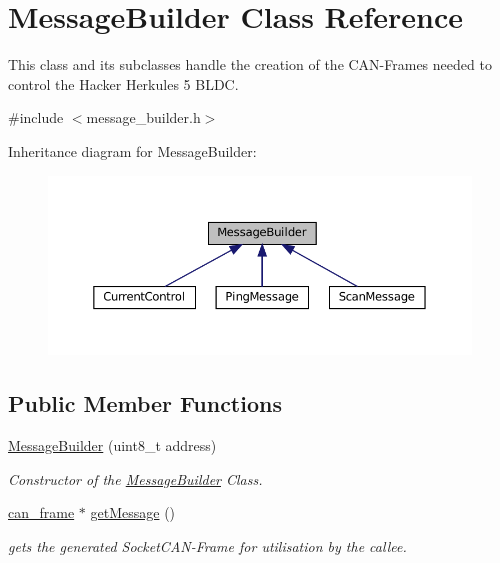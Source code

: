 \hypertarget{classMessageBuilder}{}\section{Message\+Builder Class Reference}
\label{classMessageBuilder}


This class and its subclasses handle the creation of the C\+A\+N-\/\+Frames needed to control the Hacker Herkules 5 B\+L\+DC.  




{\ttfamily \#include $<$message\+\_\+builder.\+h$>$}



Inheritance diagram for Message\+Builder\+:
\nopagebreak
\begin{figure}[H]
\begin{center}
\leavevmode
\includegraphics[width=350pt]{classMessageBuilder__inherit__graph}
\end{center}
\end{figure}
\subsection*{Public Member Functions}
\begin{DoxyCompactItemize}
\item 
\hyperlink{classMessageBuilder_a4323114db973ba35f2834b42d6b58aa7}{Message\+Builder} (uint8\+\_\+t address)
\begin{DoxyCompactList}\small\item\em Constructor of the \hyperlink{classMessageBuilder}{Message\+Builder} Class. \end{DoxyCompactList}\item 
\hyperlink{structcan__frame}{can\+\_\+frame} $\ast$ \hyperlink{classMessageBuilder_a588441e4327872e90c3442e1cecd50c3}{get\+Message} ()
\begin{DoxyCompactList}\small\item\em gets the generated Socket\+C\+A\+N-\/\+Frame for utilisation by the callee. \end{DoxyCompactList}\end{DoxyCompactItemize}
